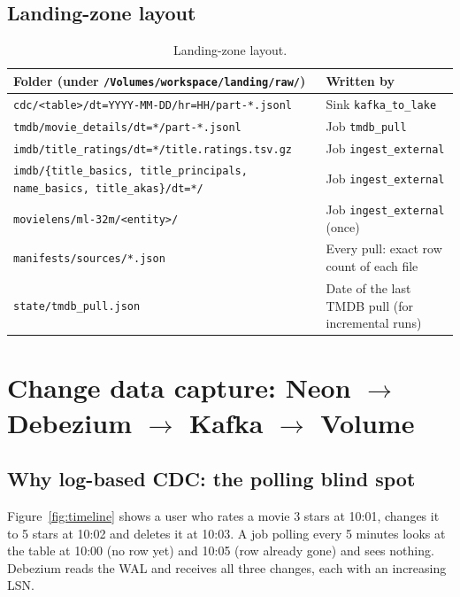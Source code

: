 \documentclass[12pt,a4paper]{article}
\newcommand{\code}[1]{\texttt{#1}}
\begin{document}
\subsection{Landing-zone layout}
\begin{table}[H]
\centering\small
\begin{tabularx}{\textwidth}{@{}lX@{}}
\toprule
Folder (under \code{/Volumes/workspace/landing/raw/}) & Written by \\
\midrule
\code{cdc/<table>/dt=YYYY-MM-DD/hr=HH/part-*.jsonl} & Sink \code{kafka\_to\_lake} \\
\code{tmdb/movie\_details/dt=*/part-*.jsonl} & Job \code{tmdb\_pull} \\
\code{imdb/title\_ratings/dt=*/title.ratings.tsv.gz} & Job \code{ingest\_external} \\
\code{imdb/\{title\_basics, title\_principals, name\_basics, title\_akas\}/dt=*/} & Job \code{ingest\_external} \\
\code{movielens/ml-32m/<entity>/} & Job \code{ingest\_external} (once) \\
\code{manifests/sources/*.json} & Every pull: exact row count of each file \\
\code{state/tmdb\_pull.json} & Date of the last TMDB pull (for incremental runs) \\
\bottomrule
\end{tabularx}
\caption{Landing-zone layout.}
\end{table}

\section{Change data capture: Neon $\rightarrow$ Debezium $\rightarrow$ Kafka $\rightarrow$ Volume}

\subsection{Why log-based CDC: the polling blind spot}
Figure~\ref{fig:timeline} shows a user who rates a movie 3 stars at 10:01, changes it to 5 stars at 10:02 and
deletes it at 10:03. A job polling every 5 minutes looks at the table at 10:00 (no row yet) and 10:05 (row already
gone) and sees nothing. Debezium reads the WAL and receives all three changes, each with an increasing LSN.
\end{document}
